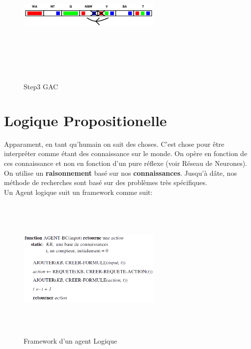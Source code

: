 \documentclass[oneside]{book}
\begin{document}
\begin{figure}[!ht]
\centering
\includegraphics[width = 7cm, height = 7cm, keepaspectratio]{gac3.png}
\caption{Step3 GAC}
\label{fig:gac3}
\end{figure}

\section{Logique Propositionelle}
Apparament, en tant qu'humain on sait des choses. C'est chose pour être interpréter comme étant des connaissance sur le monde. On opère en fonction de ces connaissance et non en fonction d'un pure réflexe (voir Réseau de Neurones). On utilise un \textbf{raisonnement} basé sur nos \textbf{connaissances}. Jusqu'à dâte, nos méthode de recherches sont basé sur des problèmes très spécifiques.\\

Un Agent logique suit un framework comme suit:\\

\begin{figure}[h!t]
\centering
\includegraphics[width = 7cm, height = 7cm, keepaspectratio]{agent_logique.png}
\caption{Framework d'un agent Logique}
\label{fig:agent_logique}
\end{figure}
\end{document}
